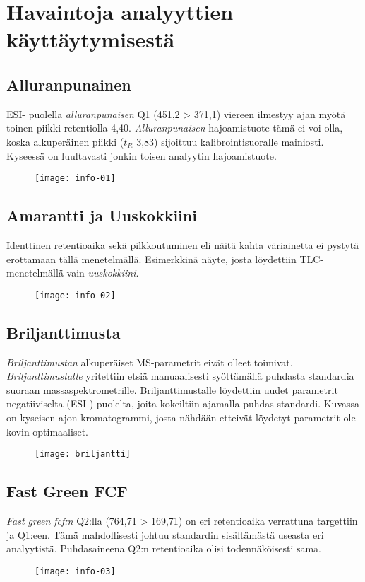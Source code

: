 \setcounter{table}{0}

\chapter{Havaintoja analyyttien käyttäytymisestä}\label{appx:havainnot}
\vspace{-24pt}
\section{Alluranpunainen}
ESI- puolella \textit{alluranpunaisen} Q1 (451,2 > 371,1) viereen ilmestyy ajan myötä toinen piikki retentiolla 4,40. \textit{Alluranpunaisen} hajoamistuote tämä ei voi olla, koska alkuperäinen piikki ($t_R$ 3,83) sijoittuu kalibrointisuoralle mainiosti. Kyseessä on luultavasti jonkin toisen analyytin hajoamistuote.
\begin{figure}[!htbp]
  \centering
    \texttt{[image: info-01]}
\end{figure}
\clearpage
\section{Amarantti ja Uuskokkiini}
Identtinen retentioaika sekä pilkkoutuminen eli näitä kahta väriainetta ei pystytä erottamaan tällä menetelmällä. Esimerkkinä näyte, josta löydettiin TLC-menetelmällä vain \textit{uuskokkiini}.
\begin{figure}[!htbp]
  \centering
    \texttt{[image: info-02]}
\end{figure}
\clearpage
\section{Briljanttimusta}
\textit{Briljanttimustan} alkuperäiset MS-parametrit eivät olleet toimivat. \textit{Briljanttimustalle} yritettiin etsiä manuaalisesti syöttämällä puhdasta standardia suoraan massaspektrometrille. Briljanttimustalle löydettiin uudet parametrit negatiiviselta (ESI-) puolelta, joita kokeiltiin ajamalla puhdas standardi. Kuvassa on kyseisen ajon kromatogrammi, josta nähdään etteivät löydetyt parametrit ole kovin optimaaliset.
\begin{figure}[!htbp]
  \centering
    \texttt{[image: briljantti]}
\end{figure}
\clearpage
\section{Fast Green FCF}
\textit{Fast green fcf:n} Q2:lla (764,71 > 169,71) on eri retentioaika verrattuna targettiin ja Q1:een. Tämä mahdollisesti johtuu standardin sisältämästä useasta eri analyytistä. Puhdasaineena Q2:n retentioaika olisi todennäköisesti sama.
\begin{figure}[!htbp]
  \centering
    \texttt{[image: info-03]}
\end{figure}
\clearpage
